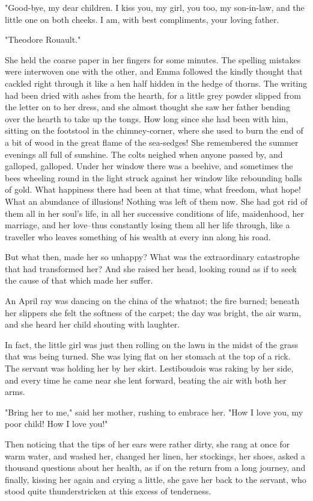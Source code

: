 \documentclass[11pt,twocolumn]{ltugboat}
\begin{document}
"Good-bye, my dear children. I kiss you, my girl, you too, my
son-in-law, and the little one on both cheeks. I am, with best
compliments, your loving father.

"Theodore Rouault."

She held the coarse paper in her fingers for some minutes. The spelling
mistakes were interwoven one with the other, and Emma followed the
kindly thought that cackled right through it like a hen half hidden
in the hedge of thorns. The writing had been dried with ashes from
the hearth, for a little grey powder slipped from the letter on to her
dress, and she almost thought she saw her father bending over the hearth
to take up the tongs. How long since she had been with him, sitting on
the footstool in the chimney-corner, where she used to burn the end of
a bit of wood in the great flame of the sea-sedges! She remembered the
summer evenings all full of sunshine. The colts neighed when anyone
passed by, and galloped, galloped. Under her window there was a beehive,
and sometimes the bees wheeling round in the light struck against her
window like rebounding balls of gold. What happiness there had been
at that time, what freedom, what hope! What an abundance of illusions!
Nothing was left of them now. She had got rid of them all in her soul's
life, in all her successive conditions of life, maidenhood, her marriage,
and her love--thus constantly losing them all her life through, like
a traveller who leaves something of his wealth at every inn along his
road.

But what then, made her so unhappy? What was the extraordinary
catastrophe that had transformed her? And she raised her head, looking
round as if to seek the cause of that which made her suffer.

An April ray was dancing on the china of the whatnot; the fire burned;
beneath her slippers she felt the softness of the carpet; the day was
bright, the air warm, and she heard her child shouting with laughter.

In fact, the little girl was just then rolling on the lawn in the midst
of the grass that was being turned. She was lying flat on her stomach
at the top of a rick. The servant was holding her by her skirt.
Lestiboudois was raking by her side, and every time he came near she
lent forward, beating the air with both her arms.

"Bring her to me," said her mother, rushing to embrace her. "How I love
you, my poor child! How I love you!"

Then noticing that the tips of her ears were rather dirty, she rang at
once for warm water, and washed her, changed her linen, her stockings,
her shoes, asked a thousand questions about her health, as if on the
return from a long journey, and finally, kissing her again and crying
a little, she gave her back to the servant, who stood quite
thunderstricken at this excess of tenderness.
\end{document}

